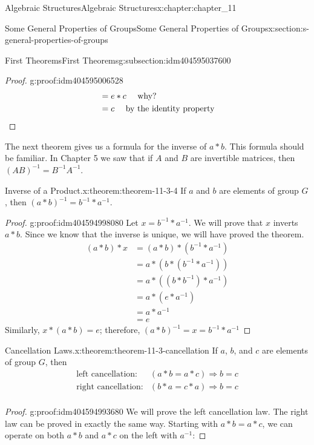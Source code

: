 \documentclass[twoside,10pt,]{book}
\newcommand{\qedhere}{\relax}
\numberwithin{equation}{section}
\begin{document}
\begin{chapterptx}{Algebraic Structures}{}{Algebraic Structures}{}{}{x:chapter:chapter_11}
\begin{sectionptx}{Some General Properties of Groups}{}{Some General Properties of Groups}{}{}{x:section:s-general-properties-of-groups}
\begin{subsectionptx}{First Theorems}{}{First Theorems}{}{}{g:subsection:idm404595037600}
\begin{proof}{}{g:proof:idm404595006528}
\begin{equation*}
\begin{split}
& = e * c \quad \textrm{  why?}\\
& = c \quad \textrm{ by the identity property}\\
\end{split}\qedhere
\end{equation*}
%
\end{proof}
The next theorem gives us a formula for the inverse of \(a * b\). This formula should be familiar. In Chapter 5 we saw that if \(A\) and \(B\) are invertible matrices, then \((A B)^{-1}= B^{-1} A^{-1}\).%
\begin{theorem}{Inverse of a Product.}{}{x:theorem:theorem-11-3-4}%
If \(a\) and \(b\) are elements of group \(G\), then \((a*b)^{-1}= b^{-1}*a^{-1}\).%
\end{theorem}
\begin{proof}{}{g:proof:idm404594998080}
Let \(x = b^{-1}*a^{-1}\). We will prove that \(x\) inverts \(a * b\).  Since we know that the inverse is unique, we will have proved the theorem.%
\begin{equation*}
\begin{split}
(a * b) * x &= (a * b) * \left(b^{-1}*a^{-1}\right)\\
&= a* \left(b*\left(b^{-1}*a^{-1}\right)\right)\\
&= a*\left(\left(b*b^{-1}\right)*a^{-1}\right)\\
&= a * \left(e * a^{-1}\right)\\
&= a * a^{-1}\\
&= e
\end{split}
\end{equation*}
Similarly, \(x * (a * b) = e\); therefore, \((a*b)^{-1}=x= b^{-1}*a^{-1}\)%
\end{proof}
\begin{theorem}{Cancellation Laws.}{}{x:theorem:theorem-11-3-cancellation}%
%
If \(a\), \(b\), and \(c\) are elements of group \(G\), then%
\begin{equation*}
\begin{array}{lc}
\textrm{left cancellation:}& (a * b = a * c)  \Rightarrow b = c\\
\textrm{right cancellation:}&  (b * a = c * a) \Rightarrow b = c\\
\end{array}
\end{equation*}
%
\end{theorem}
\begin{proof}{}{g:proof:idm404594993680}
We will prove the left cancellation law. The right law can be proved in exactly the same way. Starting with \(a * b = a * c\), we can operate on both \(a * b\) and \(a * c\) on the left with \(a^{-1}\):%

\end{proof}
\end{subsectionptx}
\end{sectionptx}
\end{chapterptx}
\end{document}

